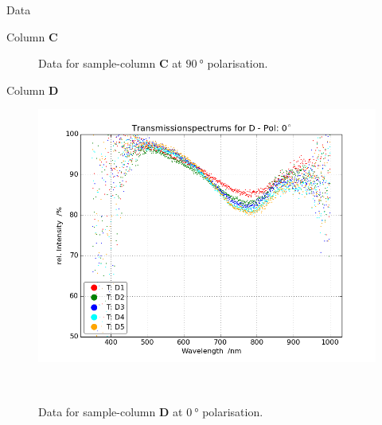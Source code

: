 \begin{appendix}
\begin{chapter}{Data}
\begin{section}{Column \textbf{C}}
\begin{figure}[ht!]
\begin{minipage}{.92\textwidth}
          \caption{Data for sample-column \textbf{C} at $\SI{90}{\degree}$
              polarisation.}
          \label{fig:TransspecRAW_CPol90}
        \end{minipage}
      \end{figure}
      
    \end{section}
    
    
    
    \newpage
    \begin{section}{Column \textbf{D}}
      \label{Appendix:DataD}
      
      \begin{figure}[ht!]
        \centering
        \begin{minipage}{.92\textwidth}
          \centering
          \includegraphics[width=\textwidth]{Figures/TransspecRAW_DPol0.png}
          \caption{Data for sample-column \textbf{D} at $\SI{0}{\degree}$
              polarisation.}
          \label{fig:TransspecRAW_DPol0}
        \end{minipage}\\
        \begin{minipage}{.92\textwidth}
          \centering

\end{minipage}
\end{figure}
\end{section}
\end{chapter}
\end{appendix}
